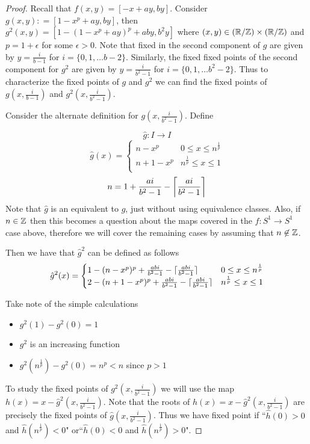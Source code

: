 \documentclass[11pt,oneside,draft]{amsart}
\numberwithin{equation}{section} %
\numberwithin{figure}{section} %
\begin{document}
\begin{proof}
 Recall that $f(x, y)=[-x +ay, by]$. Consider $g(x, y) \colon = [ 1-x^p +ay, by]$, then $g^2(x,y)=[1-(1-x^p +ay)^p +aby, b^2y ]$ where $(x,y)\in(\R / \Z) \times (\R/\Z)$ and $p=1+\epsilon$ for some $\epsilon>0$. 
 Note that fixed in the second component of $g$ are given by $y=\frac{i}{b-1}$ for $i=\{0,1, \ldots b-2\}$. Similarly, the fixed 
 fixed points of the second component for $g^2$ are given by $y=\frac{i}{b^2-1}$ for $i=\{0,1, \ldots b^2-2\}$. Thus to 
 characterize the fixed points of $g$ and $g^2$ we can find the fixed 
 points of $g\left(x, \frac{i}{b-1}\right)$ and $g^2\left(x, \frac{i}{b^2-1}\right)$. 

Consider the alternate definition for $g(x, \frac{i}{b^2-1})$. Define 

\[\hat{g}\colon I\rightarrow I\]
\[ \hat{g}(x) =
   \begin{cases} 
      n-x^p & 0\leq x \leq n^{\frac{1}{p}} \\
      n+1-x^p & n^{\frac{1}{p}}\leq x\leq 1 \\
   \end{cases}
\]
 \[ n=1+\frac{ai}{b^2-1}- \ceil*{\frac{ai}{b^2-1}}\]
Note that $\hat{g}$ is an equivalent to $g$, just without using 
equivalence classes. Also, if $n\in \Z$ then this becomes a question 
about the maps covered in the $f \colon S^1\rightarrow S^1$ case above, 
therefore we will cover the remaining cases by assuming that $n\not \in \Z$.


Then we have that $\hat{g}^2$ can be defined as follows
\[ \hat{g}^2(x) =
   \begin{cases} 
      1-(n-x^p)^p+\frac{abi}{b^2-1}-\ceil{\frac{abi}{b^2-1}} & 0\leq x \leq n^{\frac{1}{p}} \\
     2-(n+1-x^p)^p+\frac{abi}{b^2-1}-\ceil{\frac{abi}{b^2-1}} & n^{\frac{1}{p}} \leq x\leq 1 \\
   \end{cases}
\]


Take note of the simple calculations

\begin{itemize}
\item $g^2(1)-g^2(0)=1$
\item $g^2$ is an increasing function
\item $g^2(n^{\frac{1}{p}})-g^2(0)=n^p< n$ since $p>1$ 
\end{itemize}
To study the fixed points of $g^2(x, \frac{i}{b^2-1})$ we will use the 
map \newline $h(x)=x-\hat{g}^2(x, \frac{i}{b^2-1})$. 
Note that the roots of $h(x)=x-\hat{g}^2(x, \frac{i}{b^2-1})$ are 
precisely the fixed points of $\hat{g}(x, \frac{i}{b^2-1})$. Thus we have fixed point 
if ``$\hat{h}(0)>0$ and $\hat{h}(n^{\frac{1}{p}})<0$" or``$\hat{h}(0)<0$ and $\hat{h}(n^{\frac{1}{p}})>0$". 	
 


\end{proof}
\end{document}
